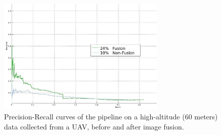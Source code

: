 \documentclass[runningheads]{llncs}
\begin{document}
\begin{figure}
  \centering
  	\includegraphics[width=8cm]{img/fusion/Roth/PR-roth-all-detections.jpg} 

  \caption{Precision-Recall curves of the pipeline on a high-altitude (60 meters) data collected from a UAV, before and after image fusion.}\label{fig:fusion-pr}
\end{figure}
\end{document}
